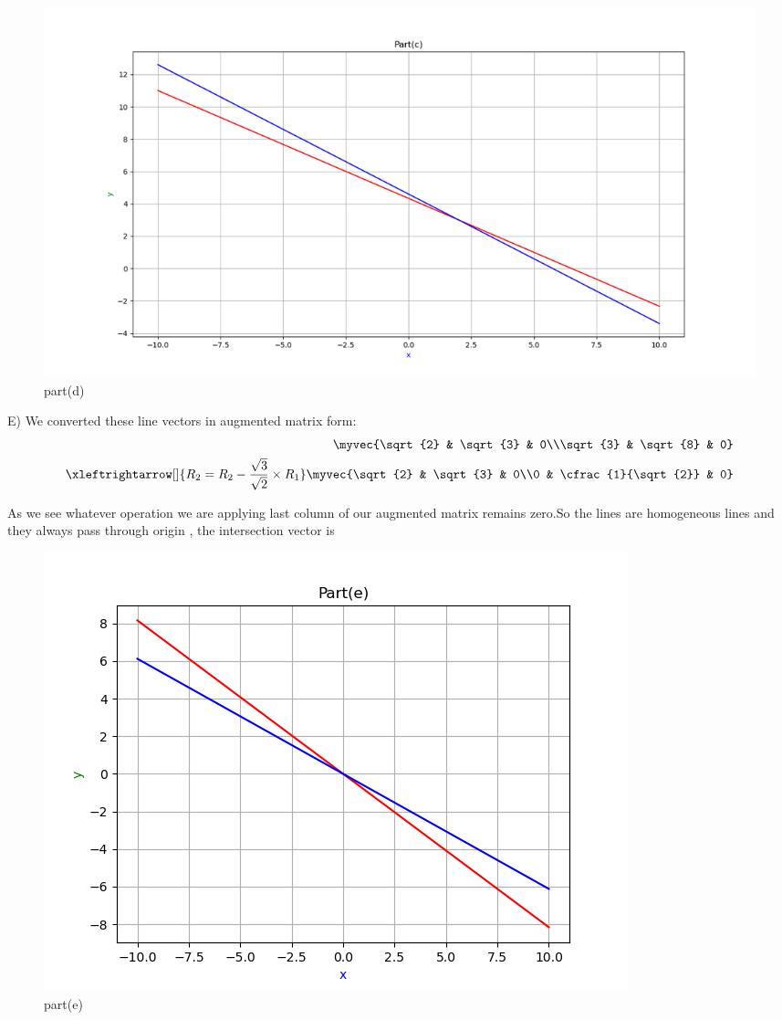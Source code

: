 \begin{enumerate}[label=\thesection.\arabic*.,ref=\thesection.\theenumi]
\renewcommand{\thefigure}{\theenumi.\arabic{figure}}
\begin{figure}[!ht]
    \centering
    \includegraphics[width=\columnwidth]{./figures/A1_partd}
\caption{part(d)}
\label{fig: part(d)}
\end{figure}

E)
We converted these line vectors in augmented matrix form:\\ 

\begin{align*}
    \myvec{\sqrt{2} & \sqrt{3} & 0\\\sqrt{3} & \sqrt{8} & 0}
\\
    \xleftrightarrow[]{R_{2}=R_{2}-\frac{\sqrt{3}}{\sqrt{2}}\times R_{1}} \myvec{\sqrt{2} & \sqrt{3} & 0\\0 & \cfrac{1}{\sqrt{2}} & 0}
\end{align*}

As we see whatever operation we are applying last column of our augmented matrix remains zero.So the lines are homogeneous lines and they always pass through  origin , the intersection vector is \\

\renewcommand{\thefigure}{\theenumi.\arabic{figure}}
\begin{figure}[!ht]
    \centering
    \includegraphics[width=\columnwidth]{./figures/A1_parte}
\caption{part(e)}
\label{fig: part(e)}
\end{figure}


\end{enumerate}
